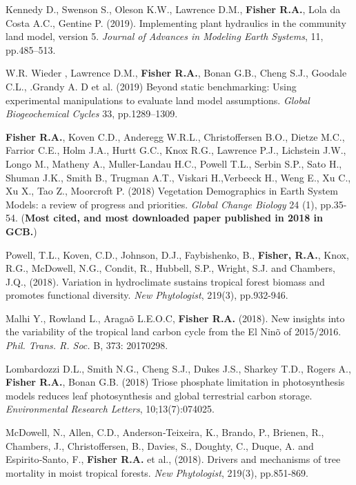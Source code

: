 \documentclass[10pt]{article}
\newenvironment{lonelist}[1][\enskip\textbullet]%
        {\vspace{-\baselineskip}\begin{list}{#1}{%
        \setlength{\itemindent}{-3pt} 
        \setlength{\partopsep}{0pt}%
        \setlength{\leftmargin}{10pt}
        \setlength{\topsep}{15pt}}}
        {\end{list}\vspace{-.3\baselineskip}}
\begin{document}
\begin{lonelist}
\item [44] Kennedy D., Swenson S., Oleson K.W., Lawrence D.M., \textbf{Fisher R.A.}, Lola da Costa A.C., Gentine P. (2019). Implementing plant hydraulics in the community land model, version 5.  \emph{Journal of Advances in Modeling Earth Systems}, 11, pp.485–513.

\item [43] W.R. Wieder ,  Lawrence D.M., \textbf{ Fisher R.A.},  Bonan G.B.,  Cheng S.J.,  Goodale C.L., .Grandy A. D et al. (2019) Beyond static benchmarking: Using experimental manipulations to evaluate land model assumptions. \emph{Global Biogeochemical Cycles}  33, pp.1289–1309.

\item[42] {\textbf{Fisher R.A.}, Koven C.D., Anderegg W.R.L., Christoffersen B.O., Dietze M.C., Farrior
C.E., Holm J.A., Hurtt G.C., Knox R.G., Lawrence P.J., Lichstein J.W., Longo M., Matheny A., Muller-Landau H.C., Powell T.L., Serbin S.P., Sato H., Shuman J.K., Smith B., Trugman A.T., Viskari H.,Verbeeck H., Weng E., Xu C., Xu X., Tao Z., Moorcroft P. (2018) Vegetation Demographics in Earth System Models:  a review of progress and priorities.  \emph{Global Change Biology}   24 (1), pp.35-54. (\textbf{Most cited, and most downloaded paper published in 2018 in GCB.}) 

\item [41]  Powell, T.L., Koven, C.D., Johnson, D.J., Faybishenko, B., \textbf{Fisher, R.A.}, Knox, R.G., McDowell, N.G., Condit, R., Hubbell, S.P., Wright, S.J. and Chambers, J.Q., (2018). Variation in hydroclimate sustains tropical forest biomass and promotes functional diversity. \emph{New Phytologist}, 219(3), pp.932-946.

\item [40]  Malhi Y., Rowland L., Araga\~o L.E.O.C, \textbf{Fisher R.A.} (2018). New insights into the variability of the tropical land carbon cycle from the El Nin\~o of 2015/2016.  \emph{Phil. Trans. R. Soc.} B, 373: 20170298. 

\item[39]  Lombardozzi D.L., Smith N.G., Cheng S.J., Dukes J.S., Sharkey T.D., Rogers A., \textbf{Fisher R.A.}, Bonan G.B. (2018) Triose phosphate limitation in photosynthesis models reduces leaf photosynthesis and global terrestrial carbon storage. \emph{Environmental Research Letters}, 10;13(7):074025.

\item[38] {McDowell, N., Allen, C.D., Anderson‐Teixeira, K., Brando, P., Brienen, R., Chambers, J., Christoffersen, B., Davies, S., Doughty, C., Duque, A. and Espirito‐Santo, F., \textbf{Fisher R.A.} et al., (2018). Drivers and mechanisms of tree mortality in moist tropical forests. \emph{New Phytologist}, 219(3), pp.851-869.}

}
\end{lonelist}
\end{document}

